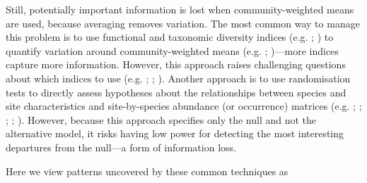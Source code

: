 \documentclass[12pt]{ecology}
\begin{document}
Still, potentially important information is lost when community-weighted means are used, because averaging removes variation.  The most common way to manage this problem is to use functional and taxonomic diversity indices (e.g. ; ) to quantify variation around community-weighted means (e.g. ; )---more indices capture more information.  However, this approach raises challenging questions about which indices to use (e.g. ; ; ).  Another approach is to use randomisation tests to directly assess hypotheses about the relationships between species and site characteristics and site-by-species abundance (or occurrence) matrices (e.g. ; ; ; ; ).  However, because this approach specifies only the null and not the alternative model, it risks having low power for detecting the most interesting departures from the null---a form of information loss.

Here we view patterns uncovered by these common techniques as 

\end{document}

